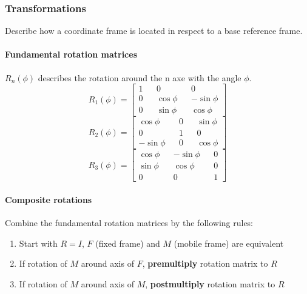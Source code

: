 \documentclass{article}
\begin{document}
	\subsubsection{Transformations}
	Describe how a coordinate frame is located in respect to a base reference frame.
	\paragraph{Fundamental rotation matrices} $R_{n}(\phi)$ describes the rotation around the n axe with the angle $\phi$.\\
	\begin{equation}
	R_{1}(\phi) = 
	\begin{bmatrix}
	1 && 0 && 0\\
	0 && \cos \phi && -\sin \phi\\
	0 && \sin \phi && \cos \phi
	\end{bmatrix}
	\end{equation}
	\begin{equation}
	R_{2}(\phi) = 
	\begin{bmatrix}
	\cos \phi && 0 && \sin \phi\\
	0 && 1 && 0\\
	-\sin \phi && 0 && \cos \phi
	\end{bmatrix}
	\end{equation}
	\begin{equation}
	R_{3}(\phi) = 
	\begin{bmatrix}
	\cos \phi && -\sin \phi && 0\\
	\sin \phi && \cos \phi && 0\\
	0 && 0 && 1
	\end{bmatrix}
	\end{equation}
	
	\paragraph{Composite rotations} Combine the fundamental rotation matrices by the following rules:
	
	\begin{enumerate}
		\item Start with $R = I$, $F$ (fixed frame) and $M$ (mobile frame) are equivalent
		\item If rotation of $M$ around axis of $F$, \textbf{premultiply} rotation matrix to $R$
		\item If rotation of $M$ around axis of $M$, \textbf{postmultiply} rotation matrix to $R$
	\end{enumerate}
\end{document}
